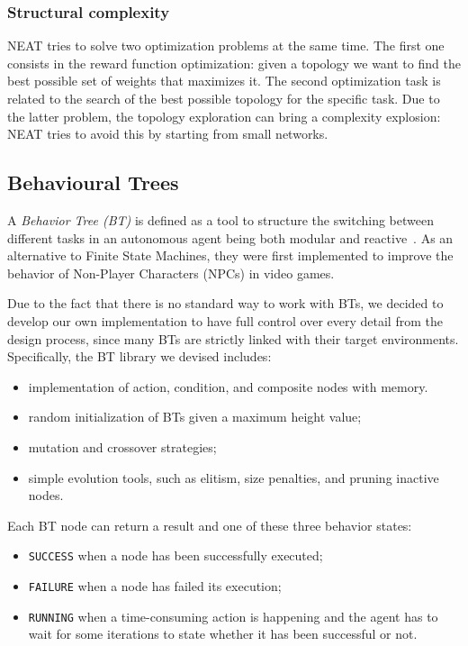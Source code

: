 \subsubsection{Structural complexity}
\label{sec:structural-complexity}
NEAT tries to solve two optimization problems at the same time. The first one consists in the reward function optimization: given a topology we want to find the best possible set of weights that maximizes it. The second optimization task is related to the search of the best possible topology for the specific task. Due to the latter problem, the topology exploration can bring a complexity explosion: NEAT tries to avoid this by starting from small networks.

\subsection{Behavioural Trees}
A \emph{Behavior Tree (BT)} is defined as a tool to structure the switching between different tasks in an autonomous agent being both modular and reactive~\cite{BT}. As an alternative to Finite State Machines, they were first implemented to improve the behavior of Non-Player Characters (NPCs) in video games.

Due to the fact that there is no standard way to work with BTs, we decided to develop our own implementation to have full control over every detail from the design process, since many BTs are strictly linked with their target environments. Specifically, the BT library we devised includes:
\begin{itemize}
    \item implementation of action, condition, and composite nodes with memory.
    \item random initialization of BTs given a maximum height value;
    \item mutation and crossover strategies;
    \item simple evolution tools, such as elitism, size penalties, and pruning inactive nodes.
\end{itemize}
Each BT node can return a result and one of these three behavior states:
\begin{itemize}
    \item \texttt{SUCCESS} when a node has been successfully executed;
    \item \texttt{FAILURE} when a node has failed its execution;
    \item \texttt{RUNNING} when a time-consuming action is happening and the agent has to wait for some iterations to state whether it has been successful or not.
\end{itemize}


